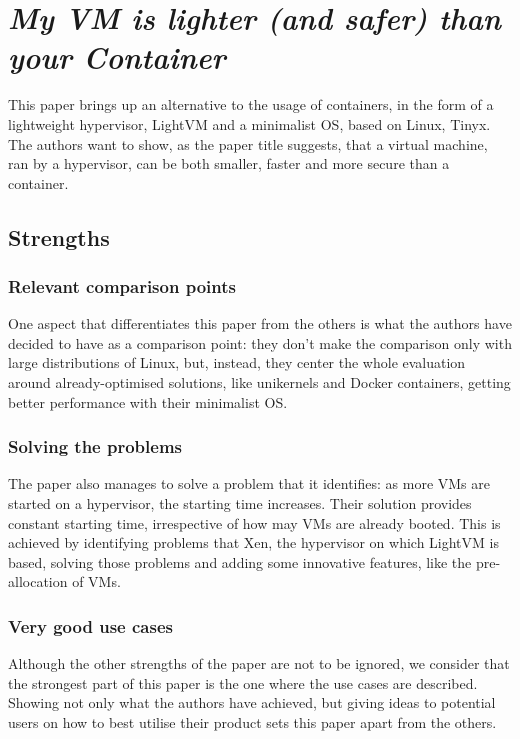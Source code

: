 \documentclass[12pt]{article}
\begin{document}


\section{\emph{My VM is lighter (and safer) than your Container}}
This paper\cite{article3} brings up an alternative to the usage of containers, in the form of a lightweight hypervisor, LightVM and a minimalist OS,
based on Linux, Tinyx. The authors want to show, as the paper title suggests, that a virtual machine, ran by a hypervisor, can be both smaller,
faster and more secure than a container.

\subsection{Strengths}
\subsubsection{Relevant comparison points}
One aspect that differentiates this paper from the others is what the authors have decided to have as a comparison point: they don't make the
comparison only with large distributions of Linux, but, instead, they center the whole evaluation around already-optimised solutions, like
unikernels and Docker containers, getting better performance with their minimalist OS. 

\subsubsection{Solving the problems}
The paper also manages to solve a problem that it identifies: as more VMs are started on a hypervisor, the starting time increases. Their
solution provides constant starting time, irrespective of how may VMs are already booted. This is achieved by identifying problems that Xen,
the hypervisor on which LightVM is based, solving those problems and adding some innovative features, like the pre-allocation of VMs.

\subsubsection{Very good use cases}
Although the other strengths of the paper are not to be ignored, we consider that the strongest part of this paper is the one where the use
cases are described. Showing not only what the authors have achieved, but giving ideas to potential users on how to best utilise their
product sets this paper apart from the others.
\end{document}

